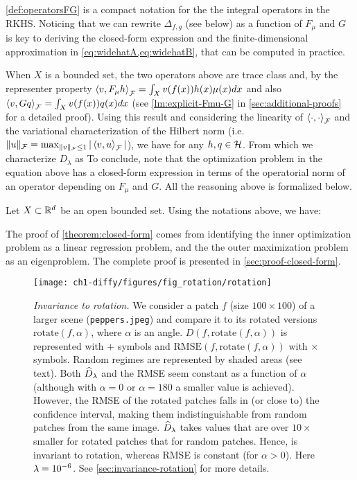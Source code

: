 \cref{def:operatorsFG} is a compact notation for the the integral operators in the RKHS. Noticing that we can rewrite $\Delta_{f,g}$ (see below) as a function of $F_\mu$ and $G$ is key to deriving the closed-form expression and the finite-dimensional approximation in \cref{eq:widehatA,eq:widehatB}, that can be computed in practice.

When $X$ is a bounded set, the two operators above are trace class and, by the representer property  $\left\langle{v},{F_\mu h}\right\rangle_{\cal F} = \int_X v(f(x)) h(x) \mu(x) dx$ and also $\left\langle{v},{G q}\right\rangle_{\cal F} = \int_X v(f(x)) q(x) dx$ (see \cref{lm:explicit-Fmu-G} in \cref{sec:additional-proofs} for a detailed proof). Using this result and considering the linearity of $\left\langle{\cdot},{\cdot}\right\rangle_{\cal F}$ and the variational characterization of the Hilbert norm (i.e. $\|u\|_{\cal F} = \max_{\|v\|_{\cal F} \leq 1} |\left\langle{v},{u}\right\rangle_{\cal F}|$), we have
for any $h, q \in \mathcal H$. From which we characterize $D_\lambda$ as
To conclude, note that the optimization problem in the equation above has a closed-form expression in terms of the operatorial norm of an operator depending on $F_\mu$ and $G$. All the reasoning above is formalized below.
\begin{theorem}\label{theorem:closed-form}
Let $X \subset \mathbb R^d$ be an open bounded set. Using the notations above, we have:
\end{theorem}
The proof of \cref{theorem:closed-form} comes from identifying the inner optimization problem as a linear regression problem, and the the outer maximization problem as an eigenproblem. The complete proof is presented in \cref{sec:proof-closed-form}.

\begin{figure}[t]
    \centering
    \texttt{[image: ch1-diffy/figures/fig\_rotation/rotation]}
    \caption[Invariance of Diffy to rotation.]{\emph{Invariance to rotation.} We consider a patch $f$ (size $100\times 100$) of a larger scene (\texttt{peppers.jpeg}) and compare it to its rotated versions $\text{rotate}(f, \alpha)$, where $\alpha$ is an angle. $D(f, \text{rotate}(f, \alpha))$ is represented with $+$ symbols and $\textrm{RMSE}(f, \text{rotate}(f, \alpha))$ with $\times$ symbols. Random regimes are represented by shaded areas (see text). Both $\widehat D_\lambda$ and the RMSE seem constant as a function of $\alpha$ (although with $\alpha=0$ or $\alpha=180$ a smaller value is achieved). However, the RMSE of the rotated patches falls in (or close to) the confidence interval, making them indistinguishable from random patches from the same image. $\widehat D_\lambda$ takes values that are over $10 \times$ smaller for rotated patches that for random patches. Hence, \Diffy is invariant to rotation, whereas RMSE is constant (for $\alpha > 0$). Here $\lambda = 10^{-6}$. See \cref{sec:invariance-rotation} for more details.}
    \label{fig:rotation}
\end{figure}

